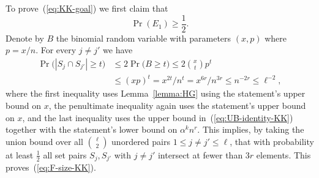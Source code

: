 \documentclass[11pt]{article}
\makeatletter
\renewenvironment{proof}[1][\proofname]
{\par\pushQED{\qed}
	\normalfont\topsep6\p@\@plus6\p@\relax\trivlist
	\item[\hskip\labelsep\bfseries#1\@addpunct{.}]
	\ignorespaces}
{\popQED\endtrivlist\@endpefalse}
\newcommand{\FF}{{\cal F}}
\renewcommand{\a}{\alpha}
\makeatother
\begin{document}
\begin{proof}[Proof of Theorem~\ref{theo:sKK-UB}]
	To prove~(\ref{eq:KK-goal}) we first claim that
	\begin{equation}\label{eq:F-size-KK}
	\Pr(E_1) \ge \frac12 .
	\end{equation}
	Denote by $B$ the binomial random variable with parameters $(x,p)$ where $p=x/n$. %
	For every $j \neq j'$ we have
	\begin{align*}
	\Pr\big(|S_j \cap S_{j'}| \ge t\big) &\le 2\Pr\big(B \ge t\big) \le 2\binom{x}{t}p^{t} \\
	&\le (xp)^{t} = x^{2t}/n^t = x^{6r}/n^{3r} \le n^{- 2r} \le \ell^{-2},
	\end{align*}
	where the first inequality uses Lemma~\ref{lemma:HG} using the statement's upper bound on $x$,
	the penultimate inequality again uses the statement's upper bound on $x$,
	and the last inequality uses the upper bound in~(\ref{eq:UB-identity-KK}) together with the statement's lower bound on $\a^k n^r$.
	This implies, by taking the union bound over all $\binom{\ell}{2}$ unordered pairs $1 \le j\neq j' \le \ell$, that with probability at least $\frac12$ all set pairs $S_j,S_{j'}$ with $j \neq j'$ intersect at fewer than $3r$ elements. This proves~(\ref{eq:F-size-KK}).
	

\end{proof}
\end{document}
